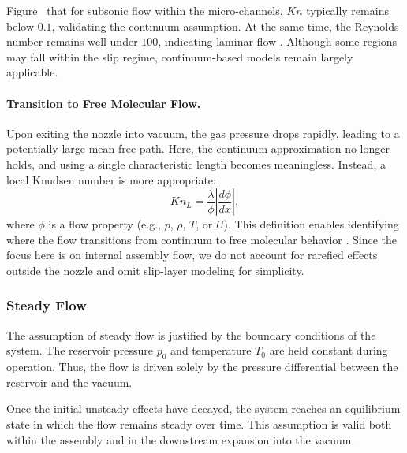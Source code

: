 	
	Figure~ that for subsonic flow within the micro-channels, \(Kn\) typically remains below \(0.1\), validating the continuum assumption. At the same time, the Reynolds number remains well under \(100\), indicating laminar flow \cite{ames1953compressible, comsol_microfluidics_guide}. Although some regions may fall within the slip regime, continuum-based models remain largely applicable. 

	\paragraph{Transition to Free Molecular Flow.}
		Upon exiting the nozzle into vacuum, the gas pressure drops rapidly, leading to a potentially large mean free path.
		Here, the continuum approximation no longer holds, and using a single characteristic length becomes meaningless.
		Instead, a local Knudsen number is more appropriate:
		\begin{equation}
		  Kn_L
		  = \frac{\lambda}{\phi}\left|\frac{d\phi}{dx}\right|,
		\end{equation}
		where \(\phi\) is a flow property (e.g., \(p\), \(\rho\), \(T\), or \(U\)).
		This definition enables identifying where the flow transitions from continuum to free molecular behavior \cite{bird_dsmc_2013,Grabe2008,LiLam1964}.
		Since the focus here is on internal assembly flow, we do not account for rarefied effects outside the nozzle and omit slip-layer modeling for simplicity.

\subsubsection*{Steady Flow}
	The assumption of steady flow is justified by the boundary conditions of the system.
	The reservoir pressure $p_0$ and temperature $T_0$ are held constant during operation.
	Thus, the flow is driven solely by the pressure differential between the reservoir and the vacuum.

	Once the initial unsteady effects have decayed, the system reaches an equilibrium state in which the flow remains steady over time.
	This assumption is valid both within the assembly and in the downstream expansion into the vacuum.
	\cite{LiLam1964}

